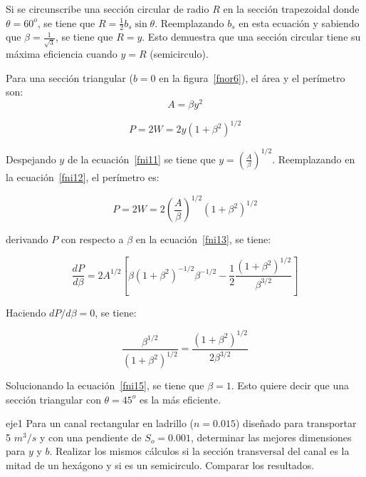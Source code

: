 \documentclass[11pt, oneside]{article}
\begin{document}
Si se circunscribe una secci\'on circular de radio $R$ en la secci\'on trapezoidal donde $\theta=60^o$, se tiene que $R=\frac{1}{2}b_s \sin \theta$. Reemplazando $b_s$ en esta ecuaci\'on y sabiendo que $\beta=\frac{1}{\sqrt{3}}$, se tiene que $R=y$. Esto demuestra que una secci\'on circular tiene su m\'axima eficiencia cuando $y=R$ (semicirculo). 

Para una secci\'on triangular ($b=0$ en la figura~\ref{fnor6}), el \'area y el per\'imetro son:
\begin{equation}
A = \beta y^2
\label{fni11}
\end{equation}

\begin{equation}
P = 2W =  2y \left( 1+\beta^2 \right)^{1/2}
\label{fni12}
\end{equation}

Despejando $y$ de la ecuaci\'on~\ref{fni11} se tiene que $y = \left( \frac{A}{\beta} \right)^{1/2}$. Reemplazando en la ecuaci\'on~\ref{fni12}, el per\'imetro es:

\begin{equation}
P = 2W =  2\left(\frac{A}{\beta}\right)^{1/2} \left( 1+\beta^2 \right)^{1/2}
\label{fni13}
\end{equation}

derivando $P$ con respecto a $\beta$ en la ecuaci\'on~\ref{fni13}, se tiene:

\begin{equation}
\frac{dP}{d\beta} =2A^{1/2}\left[ \beta \left( 1+\beta^2 \right)^{-1/2} \beta^{-1/2} - \frac{1}{2} \frac{\left( 1+\beta^2 \right)^{1/2}}{\beta^{3/2}} \right]
\label{fni14}
\end{equation}

Haciendo $dP/d\beta = 0$, se tiene:

\begin{equation}
\frac{\beta^{1/2}}{\left( 1+\beta^2 \right)^{1/2}} = \frac{\left( 1+\beta^2 \right)^{1/2}}{2 \beta^{3/2}}
\label{fni15}
\end{equation}

Solucionando la ecuaci\'on~\ref{fni15}, se tiene que $\beta=1$. Esto quiere decir que una secci\'on triangular con $\theta=45^o$ es la m\'as eficiente.

\begin{eje}{}{eje1}
Para un canal rectangular en ladrillo ($n=0.015$) dise\~nado para transportar 5 $m^3 /s$ y con una pendiente de $S_o = 0.001$, determinar las mejores dimensiones para $y$ y $b$. Realizar los mismos c\'alculos si la secci\'on transversal del canal es la mitad de un hex\'agono y si es un semicirculo. Comparar los resultados.  
\end{eje}
\end{document}
